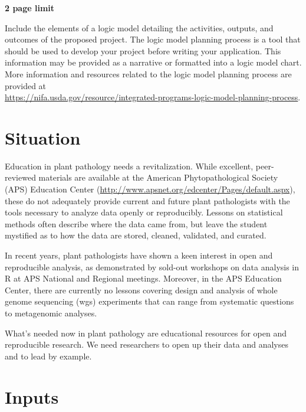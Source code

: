 \documentclass[12pt,letterpaper]{article}
\title{\ruleline{Logic Model}}
\begin{document}
\maketitle
\linenumbers

\textbf{2 page limit}

Include the elements of a logic model detailing the activities, outputs, and
outcomes of the proposed project. The logic model planning process is a tool
that should be used to develop your project before writing your application.
This information may be provided as a narrative or formatted into a logic model
chart. More information and resources related to the logic model planning
process are provided at \\
\url{https://nifa.usda.gov/resource/integrated-programs-logic-model-planning-process}.

\section{Situation}


Education in plant pathology needs a revitalization. While excellent, 
peer-reviewed materials are available at the American Phytopathological Society
(APS) Education Center (\url{http://www.apsnet.org/edcenter/Pages/default.aspx}),
these do not adequately provide current and future plant pathologists with the
tools necessary to analyze data openly or reproducibly. Lessons on statistical
methods often describe where the data came from, but leave the student mystified
as to how the data are stored, cleaned, validated, and curated.

In recent years, plant pathologists have shown a keen interest in open and
reproducible analysis, as demonstrated by sold-out workshops on data analysis in
R at APS National and Regional meetings. Moreover, in the APS Education Center,
there are currently no lessons covering design and analysis of whole genome
sequencing (wgs) experiments that can range from systematic questions to
metagenomic analyses.

What's needed now in plant pathology are educational resources for open and
reproducible research. We need researchers to open up their data and analyses
and to lead by example.

\section{Inputs}
\end{document}
